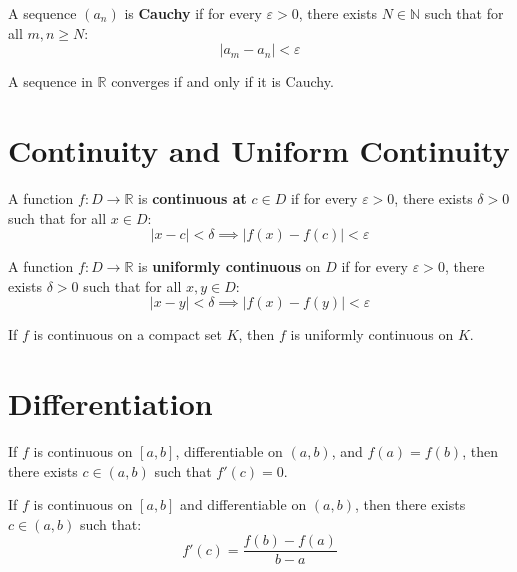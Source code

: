 \begin{definition}
A sequence $(a_n)$ is \textbf{Cauchy} if for every $\varepsilon > 0$, there exists $N \in \mathbb{N}$ such that for all $m, n \geq N$:
\[|a_m - a_n| < \varepsilon\]
\end{definition}

\begin{theorem}
A sequence in $\mathbb{R}$ converges if and only if it is Cauchy.
\end{theorem}

\section{Continuity and Uniform Continuity}

\begin{definition}
A function $f: D \to \mathbb{R}$ is \textbf{continuous at} $c \in D$ if for every $\varepsilon > 0$, there exists $\delta > 0$ such that for all $x \in D$:
\[|x - c| < \delta \implies |f(x) - f(c)| < \varepsilon\]
\end{definition}

\begin{definition}
A function $f: D \to \mathbb{R}$ is \textbf{uniformly continuous} on $D$ if for every $\varepsilon > 0$, there exists $\delta > 0$ such that for all $x, y \in D$:
\[|x - y| < \delta \implies |f(x) - f(y)| < \varepsilon\]
\end{definition}

\begin{theorem}
If $f$ is continuous on a compact set $K$, then $f$ is uniformly continuous on $K$.
\end{theorem}

\section{Differentiation}

\begin{theorem}
If $f$ is continuous on $[a,b]$, differentiable on $(a,b)$, and $f(a) = f(b)$, then there exists $c \in (a,b)$ such that $f'(c) = 0$.
\end{theorem}

\begin{theorem}
If $f$ is continuous on $[a,b]$ and differentiable on $(a,b)$, then there exists $c \in (a,b)$ such that:
\[f'(c) = \frac{f(b) - f(a)}{b - a}\]
\end{theorem}

